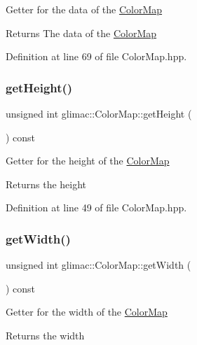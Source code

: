 Getter for the data of the \hyperlink{classglimac_1_1_color_map}{Color\+Map} \begin{DoxyReturn}{Returns}
The data of the \hyperlink{classglimac_1_1_color_map}{Color\+Map} 
\end{DoxyReturn}


Definition at line 69 of file Color\+Map.\+hpp.

\mbox{\label{classglimac_1_1_color_map_a863f67a6f8da5b60cd24960e2213d99f}} 
\subsubsection{\texorpdfstring{get\+Height()}{getHeight()}}
{\footnotesize\ttfamily unsigned int glimac\+::\+Color\+Map\+::get\+Height (\begin{DoxyParamCaption}{ }\end{DoxyParamCaption}) const\hspace{0.3cm}{\ttfamily [inline]}}

Getter for the height of the \hyperlink{classglimac_1_1_color_map}{Color\+Map} \begin{DoxyReturn}{Returns}
the height 
\end{DoxyReturn}


Definition at line 49 of file Color\+Map.\+hpp.

\mbox{\label{classglimac_1_1_color_map_a760221f166c7194706706ecb1b01f289}} 
\subsubsection{\texorpdfstring{get\+Width()}{getWidth()}}
{\footnotesize\ttfamily unsigned int glimac\+::\+Color\+Map\+::get\+Width (\begin{DoxyParamCaption}{ }\end{DoxyParamCaption}) const\hspace{0.3cm}{\ttfamily [inline]}}

Getter for the width of the \hyperlink{classglimac_1_1_color_map}{Color\+Map} \begin{DoxyReturn}{Returns}
the width 
\end{DoxyReturn}


